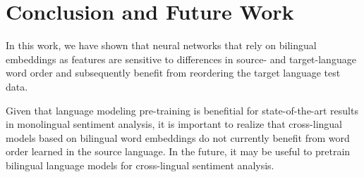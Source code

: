 \documentclass[11pt,a4paper]{article}
\begin{document}
\section{Conclusion and Future Work}

In this work, we have shown that neural networks that rely on bilingual embeddings as features
are sensitive to differences in source- and target-language word order and subsequently benefit from reordering the target language test data. 

Given that language modeling pre-training is benefitial for state-of-the-art results in monolingual sentiment analysis, it is important to realize that cross-lingual models based on bilingual word embeddings do not currently benefit from word order learned in the source language. In the future, it may be useful to pretrain bilingual language models for cross-lingual sentiment analysis.



\end{document}
